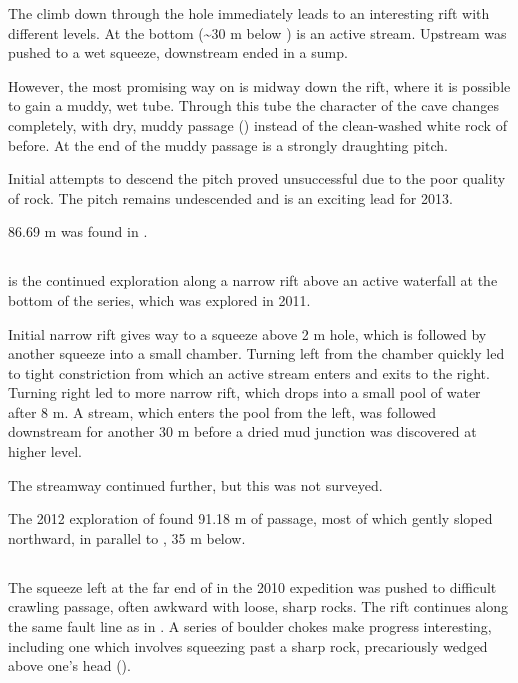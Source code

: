 The climb down through the hole immediately leads to an interesting rift
with different levels. At the bottom (\textasciitilde 30 m below
) is an active stream. Upstream was pushed to a
wet squeeze, downstream ended in a sump.

However, the most promising way on is midway down the rift, where it is
possible to gain a muddy, wet tube. Through this tube the character of
the cave changes completely, with dry, muddy passage () instead
of the clean-washed white rock of before. At the end of the muddy
passage is a strongly draughting pitch.

Initial attempts to descend the pitch proved unsuccessful due to the
poor quality of rock. The pitch remains undescended and is an exciting
lead for 2013.

86.69 m was found in .


\subsection{\texorpdfstring{}{Yorkshire}}\label{yorkshire}

 is the continued exploration along a narrow rift above
an active waterfall at the bottom of the  series,
which was explored in 2011.

Initial narrow rift gives way to a squeeze above 2 m hole, which is
followed by another squeeze into a small chamber. Turning left from the
chamber quickly led to tight constriction from which an active stream
enters and exits to the right. Turning right led to more narrow rift,
which drops into a small pool of water after 8 m. A stream, which enters
the pool from the left, was followed downstream for another 30 m before
a dried mud junction was discovered at higher level.

The streamway continued further, but this was not surveyed.

The 2012 exploration of  found 91.18 m of passage, most
of which gently sloped northward, in parallel to , 35 m below.


\subsection{\texorpdfstring{}{Minotaur Rift}}

The squeeze left at the far end of  in the 2010
expedition was pushed to difficult crawling passage, often awkward with
loose, sharp rocks. The rift continues along the same fault line as in
. A series of boulder chokes make progress
interesting, including one which involves squeezing past a sharp rock,
precariously wedged above one's head ().

